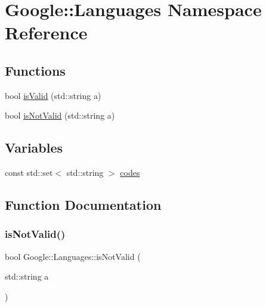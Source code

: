 \hypertarget{a00036}{}\section{Google\+:\+:Languages Namespace Reference}
\label{a00036}
\subsection*{Functions}
\begin{DoxyCompactItemize}
\item 
bool \hyperlink{a00036_a865e8f79f8de870b2e6eb5cf40b0fac9}{is\+Valid} (std\+::string a)
\item 
bool \hyperlink{a00036_a0ed7c663d00601bb86dd56e55a5304a8}{is\+Not\+Valid} (std\+::string a)
\end{DoxyCompactItemize}
\subsection*{Variables}
\begin{DoxyCompactItemize}
\item 
const std\+::set$<$ std\+::string $>$ \hyperlink{a00036_a7323c7ef1fa5d84f505aa504095b788a}{codes}
\end{DoxyCompactItemize}


\subsection{Function Documentation}
\mbox{\label{a00036_a0ed7c663d00601bb86dd56e55a5304a8}} 
\subsubsection{\texorpdfstring{is\+Not\+Valid()}{isNotValid()}}
{\footnotesize\ttfamily bool Google\+::\+Languages\+::is\+Not\+Valid (\begin{DoxyParamCaption}\item[{std\+::string}]{a }\end{DoxyParamCaption})}

\mbox{\label{a00036_a865e8f79f8de870b2e6eb5cf40b0fac9}} 
